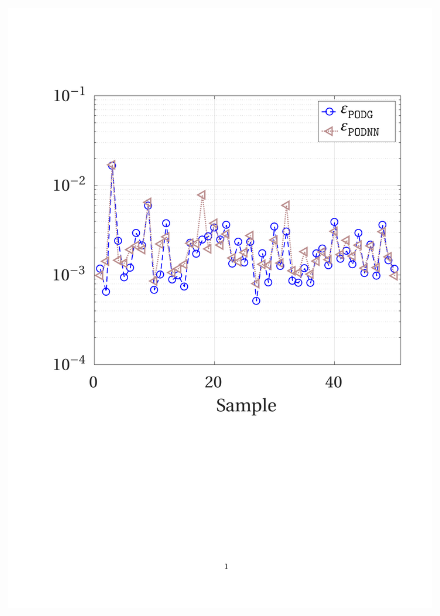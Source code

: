 \documentclass[12pt, a4paper, twoside, openright, notitlepage]{report}
\numberwithin{equation}{chapter}
\theoremstyle{theorem}
\theoremstyle{definition}
\theoremstyle{remark}
\theoremstyle{proposition}
\numberwithin{figure}{chapter}
\begin{document}
\begin{figure}[H]
		
			\center
			\includegraphics[scale = 0.4, trim = {1.5cm 9cm 1.5cm 3.5cm}, clip]{poisson2d_2_pointwise_error}
			\hfill

\end{figure}
\end{document}
